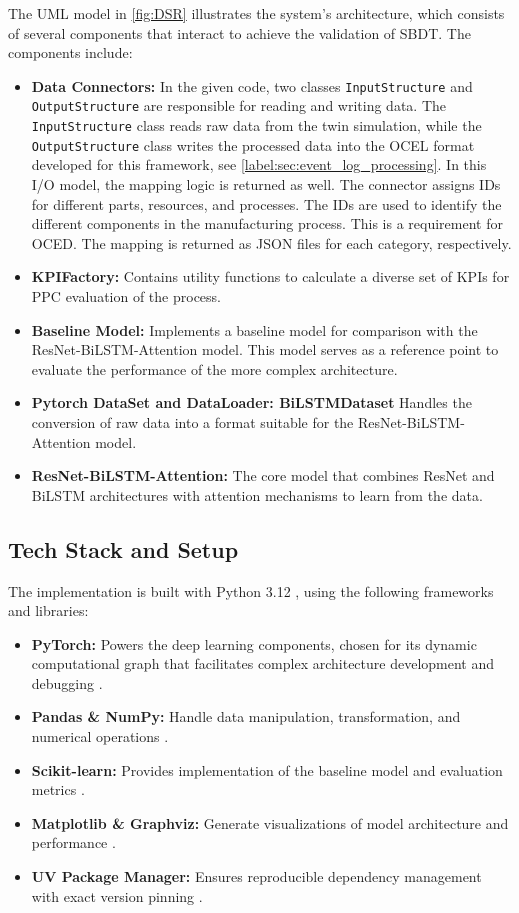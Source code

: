 The UML model \autocite{PlantUML} in \autoref{fig:DSR} illustrates the system's architecture, which consists of several components that interact to achieve the validation of SBDT. The components include:
\begin{itemize}
  \item \textbf{Data Connectors:} In the given code, two classes \texttt{InputStructure} and \texttt{OutputStructure} are responsible for reading and writing data. The \texttt{InputStructure} class reads raw data from the twin simulation, while the \texttt{OutputStructure} class writes the processed data into the OCEL format developed for this framework, see \autoref{label:sec:event_log_processing}. In this I/O model, the mapping logic is returned as well. The connector assigns IDs for different parts, resources, and processes. The IDs are used to identify the different components in the manufacturing process. This is a requirement for OCED. The mapping is returned as JSON files for each category, respectively.
  \item \textbf{KPIFactory:} Contains utility functions to calculate a diverse set of KPIs for PPC evaluation of the process.
  \item \textbf{Baseline Model:} Implements a baseline model for comparison with the ResNet-BiLSTM-Attention model. This model serves as a reference point to evaluate the performance of the more complex architecture.
  \item \textbf{Pytorch DataSet and DataLoader: BiLSTMDataset} Handles the conversion of raw data into a format suitable for the ResNet-BiLSTM-Attention model.
  \item \textbf{ResNet-BiLSTM-Attention:} The core model that combines ResNet and BiLSTM architectures with attention mechanisms to learn from the data.
\end{itemize}

\subsection{Tech Stack and Setup}
The implementation is built with Python 3.12 \autocite{Python}, using the following frameworks and libraries:

\begin{itemize}
  \item \textbf{PyTorch:} Powers the deep learning components, chosen for its dynamic computational graph that facilitates complex architecture development and debugging \autocite{PyTorch}.
  \item \textbf{Pandas \& NumPy:} Handle data manipulation, transformation, and numerical operations \autocite{NumPy, Pandas}.
  \item \textbf{Scikit-learn:} Provides implementation of the baseline model and evaluation metrics \autocite{ScikitLearn}.
  \item \textbf{Matplotlib \& Graphviz:} Generate visualizations of model architecture and performance \autocite{Matplotlib, Graphviz}.
  \item \textbf{UV Package Manager:} Ensures reproducible dependency management with exact version pinning \autocite{UV}.
\end{itemize}

